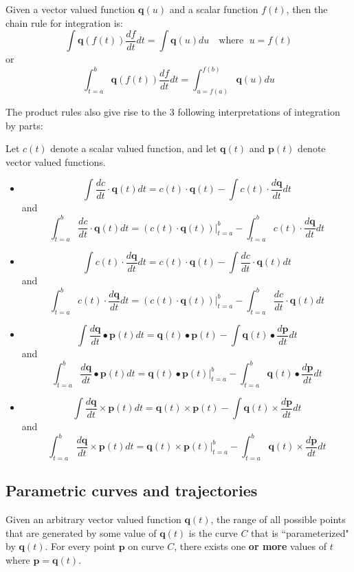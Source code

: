 \documentclass{article}
\begin{document}
Given a vector valued function \(\mathbf{q}(u)\) and a scalar function \(f(t)\), then the chain rule for integration is:
\[\int \mathbf{q}(f(t))\frac{df}{dt}dt = \int \mathbf{q}(u) du \quad\text{where }\;u = f(t)\]
or
\[\int_{t = a}^b \mathbf{q}(f(t))\frac{df}{dt}dt = \int_{u = f(a)}^{f(b)} \mathbf{q}(u) du\]

The product rules also give rise to the 3 following interpretations of integration by parts: 

Let \(c(t)\) denote a scalar valued function, and let \(\mathbf{q}(t)\) and \(\mathbf{p}(t)\) denote vector valued functions.
\begin{itemize}
\item 
\[\int \frac{dc}{dt} \cdot \mathbf{q}(t) dt = c(t) \cdot \mathbf{q}(t) - \int c(t) \cdot \frac{d\mathbf{q}}{dt}dt\]
and
\[\int_{t=a}^b \frac{dc}{dt} \cdot \mathbf{q}(t) dt = (c(t) \cdot \mathbf{q}(t)) \Big|_{t=a}^b - \int_{t=a}^b c(t) \cdot \frac{d\mathbf{q}}{dt}dt\]
\item 
\[\int c(t) \cdot \frac{d\mathbf{q}}{dt}dt = c(t) \cdot \mathbf{q}(t) - \int \frac{dc}{dt} \cdot \mathbf{q}(t) dt\]
and
\[\int_{t=a}^b c(t) \cdot \frac{d\mathbf{q}}{dt}dt = (c(t) \cdot \mathbf{q}(t)) \Big|_{t=a}^b - \int_{t=a}^b \frac{dc}{dt} \cdot \mathbf{q}(t) dt\]
\item 
\[\int \frac{d\mathbf{q}}{dt} \bullet \mathbf{p}(t) dt = \mathbf{q}(t) \bullet \mathbf{p}(t) - \int \mathbf{q}(t) \bullet \frac{d\mathbf{p}}{dt}dt\]
and
\[\int_{t=a}^b \frac{d\mathbf{q}}{dt} \bullet \mathbf{p}(t) dt = \mathbf{q}(t) \bullet \mathbf{p}(t)\Big|_{t=a}^b - \int_{t=a}^b \mathbf{q}(t) \bullet \frac{d\mathbf{p}}{dt}dt\]
\item 
\[\int \frac{d\mathbf{q}}{dt} \times \mathbf{p}(t) dt = \mathbf{q}(t) \times \mathbf{p}(t) - \int \mathbf{q}(t) \times \frac{d\mathbf{p}}{dt}dt\]
and
\[\int_{t=a}^b \frac{d\mathbf{q}}{dt} \times \mathbf{p}(t) dt = \mathbf{q}(t) \times \mathbf{p}(t)\Big|_{t=a}^b - \int_{t=a}^b \mathbf{q}(t) \times \frac{d\mathbf{p}}{dt}dt\]
\end{itemize}




\subsection*{Parametric curves and trajectories}

Given an arbitrary vector valued function \(\mathbf{q}(t)\), the range of all possible points that are generated by some value of \(\mathbf{q}(t)\) is the curve \(C\) that is ``parameterized" by \(\mathbf{q}(t)\). For every point \(\mathbf{p}\) on curve \(C\), there exists one {\bf or more} values of \(t\) where \(\mathbf{p} = \mathbf{q}(t)\).   
\end{document}
